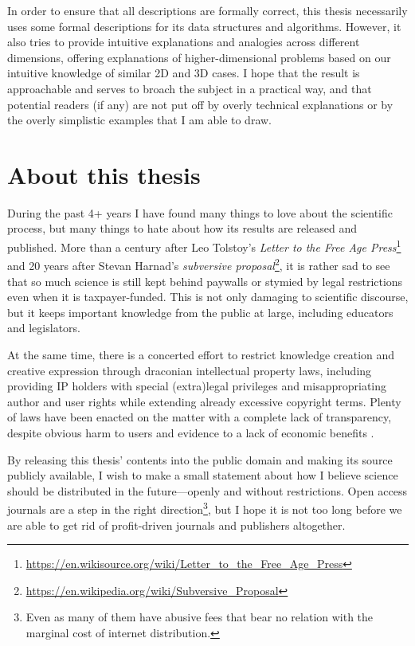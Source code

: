 In order to ensure that all descriptions are formally correct, this thesis necessarily uses some formal descriptions for its data structures and algorithms.
However, it also tries to provide intuitive explanations and analogies across different dimensions, offering explanations of higher-dimensional problems based on our intuitive knowledge of similar 2D and 3D cases.
I hope that the result is approachable and serves to broach the subject in a practical way, and that potential readers (if any) are not put off by overly technical explanations or by the overly simplistic examples that I am able to draw.

\section*{About this thesis}

During the past 4+ years I have found many things to love about the scientific process, but many things to hate about how its results are released and published.
More than a century after Leo Tolstoy's \emph{Letter to the Free Age Press}\footnote{\url{https://en.wikisource.org/wiki/Letter_to_the_Free_Age_Press}} and 20 years after Stevan Harnad's \emph{subversive proposal}\footnote{\url{https://en.wikipedia.org/wiki/Subversive_Proposal}}, it is rather sad to see that so much science is still kept behind paywalls or stymied by legal restrictions even when it is taxpayer-funded.
This is not only damaging to scientific discourse, but it keeps important knowledge from the public at large, including educators and legislators.

At the same time, there is a concerted effort to restrict knowledge creation and creative expression through draconian intellectual property laws, including providing IP holders with special (extra)legal privileges and misappropriating author and user rights while extending already excessive copyright terms.
Plenty of laws have been enacted on the matter with a complete lack of transparency, despite obvious harm to users and evidence to a lack of economic benefits \citep{Hargreaves11,Reda14,EFI15}.

By releasing this thesis' contents into the public domain and making its source publicly available, I wish to make a small statement about how I believe science should be distributed in the future---openly and without restrictions.
Open access journals are a step in the right direction\footnote{Even as many of them have abusive fees that bear no relation with the marginal cost of internet distribution.}, but I hope it is not too long before we are able to get rid of profit-driven journals and publishers altogether.

